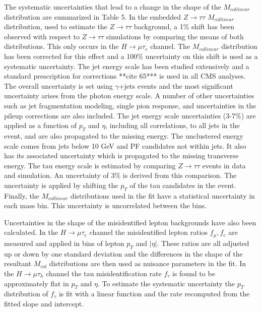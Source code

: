 \documentclass[oneside, letterpaper, oldfontcommands]{memoir}
\begin{document}
{{{\qquad The systematic uncertainties that lead to a change in the shape of the $M_{collinear}$ distribution are summarized in Table 5. In the embedded $Z \rightarrow \tau\tau$ $M_{collinear}$ distribution, used to estimate the $Z \rightarrow \tau\tau$ background, a 1\% shift has been observed with respect to $Z \rightarrow \tau\tau$ simulations by comparing the means of both distributions. This only occurs in the $H \rightarrow \mu\tau_{e}$ channel. The $M_{collinear}$ distribution has been corrected for this effect and a 100\% uncertainty on this shift is used as a systematic uncertainty. The jet energy scale has been studied extensively and a standard prescription for corrections **cite 65*** is used in all CMS analyses. The overall uncertainty is set using $\gamma$+jets events and the most significant uncertainty arises from the photon energy scale. A number of other uncertainties such as jet fragmentation modeling, single pion response, and uncertainties in the pileup corrections are also included. The jet energy scale uncertainties (3-7\%) are applied as a function of $p_{T}$ and $\eta$, including all correlations, to all jets in the event, and are also propagated to the missing energy. The unclustered energy scale comes from jets below 10 GeV and PF candidates not within jets. It also has its associated uncertainty which is propagated to the missing transverse energy. The tau energy scale is estimated by comparing $Z \rightarrow \tau\tau$ events in data and simulation. An uncertainty of 3\% is derived from this comparison. The uncertainty is applied by shifting the $p_{T}$ of the tau candidates in the event. Finally, the $M_{collinear}$ distributions used in the fit have a statistical uncertainty in each mass bin. This uncertainty is uncorrelated between the bins.

\qquad Uncertainties in the shape of the misidentified lepton backgrounds have also been calculated. In the $H \rightarrow \mu\tau_{e}$ channel the misidentified lepton ratios $f_{\mu},f_{e}$ are measured and applied in bins of lepton $p_{T}$ and $|\eta|$. These ratios are all adjusted up or down by one standard deviation and the differences in the shape of the resultant $M_{col}$ distributions are then used as nuisance parameters in the fit. In the $H \rightarrow \mu\tau_{h}$ channel the tau misidentification rate $f_{\tau}$ is found to be approximately flat in $p_{T}$ and $\eta$. To estimate the systematic uncertainty the $p_{T}$ distribution of $f_{\tau}$ is fit with a linear function and the rate recomputed from the fitted slope and intercept. 
}}}
\end{document}
